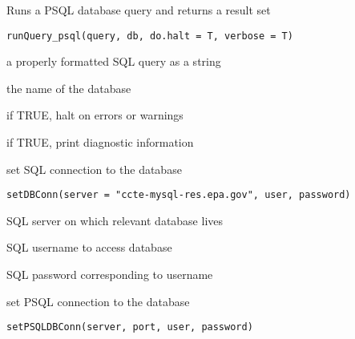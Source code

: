 \documentclass[letterpaper]{book}
\begin{document}
%
\begin{Description}\relax
Runs a PSQL database query and returns a result set
\end{Description}
%
\begin{Usage}
\begin{verbatim}
runQuery_psql(query, db, do.halt = T, verbose = T)
\end{verbatim}
\end{Usage}
%
\begin{Arguments}
\begin{ldescription}
\item[\code{query}] a properly formatted SQL query as a string

\item[\code{db}] the name of the database

\item[\code{do.halt}] if TRUE, halt on errors or warnings

\item[\code{verbose}] if TRUE, print diagnostic information
\end{ldescription}
\end{Arguments}
%
\begin{Description}\relax
set SQL connection to the database
\end{Description}
%
\begin{Usage}
\begin{verbatim}
setDBConn(server = "ccte-mysql-res.epa.gov", user, password)
\end{verbatim}
\end{Usage}
%
\begin{Arguments}
\begin{ldescription}
\item[\code{server}] SQL server on which relevant database lives

\item[\code{user}] SQL username to access database

\item[\code{password}] SQL password corresponding to username
\end{ldescription}
\end{Arguments}
%
\begin{Description}\relax
set PSQL connection to the database
\end{Description}
%
\begin{Usage}
\begin{verbatim}
setPSQLDBConn(server, port, user, password)
\end{verbatim}
\end{Usage}
\end{document}
